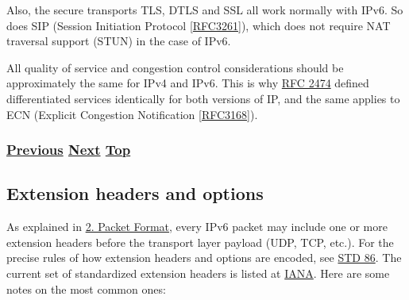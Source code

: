 \documentclass[
]{article}
\begin{document}
Also, the secure transports TLS, DTLS and SSL all work normally with
IPv6. So does SIP (Session Initiation Protocol
{[}\href{https://www.rfc-editor.org/info/rfc3261}{RFC3261}{]}), which
does not require NAT traversal support (STUN) in the case of IPv6.

All quality of service and congestion control considerations should be
approximately the same for IPv4 and IPv6. This is why
\href{https://www.rfc-editor.org/info/rfc2474}{RFC 2474} defined
differentiated services identically for both versions of IP, and the
same applies to ECN (Explicit Congestion Notification
{[}\href{https://www.rfc-editor.org/info/rfc3168}{RFC3168}{]}).

\subsubsection{\texorpdfstring{\hyperref[routing]{Previous}
\hyperref[extension-headers-and-options]{Next}
\hyperref[ipv6-basic-technology]{Top}}{Previous Next Top}}\label{previous-next-top-15}

\pagebreak

\subsection{Extension headers and
options}\label{extension-headers-and-options}

As explained in \hyperref[packet-format]{2. Packet Format}, every IPv6
packet may include one or more extension headers before the transport
layer payload (UDP, TCP, etc.). For the precise rules of how extension
headers and options are encoded, see
\href{https://www.rfc-editor.org/info/std86}{STD 86}. The current set of
standardized extension headers is listed at
\href{https://www.iana.org/assignments/ipv6-parameters/ipv6-parameters.xhtml\#extension-header}{IANA}.
Here are some notes on the most common ones:
\end{document}
